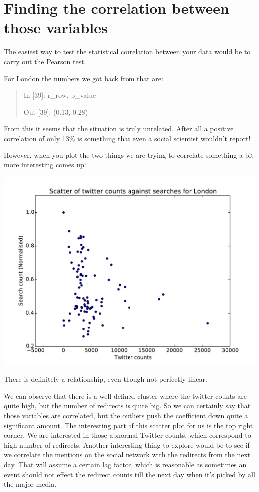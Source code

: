 \documentclass[minf,frontabs,twoside,singlespacing,parskip]{infthesis}
\begin{document}
\section{Finding the correlation between those variables}

The easiest way to test the statistical correlation between your data would be to carry out the Pearson test.

For London the numbers we got back from that are:
\begin{quotation}
In [39]: r\_row, p\_value

Out [39]: (0.13, 0.28)
\end{quotation}

From this it seems that the situation is truly unrelated. After all a positive correlation of only 13\% is something that even a social scientist wouldn't report!

However, when you plot the two things we are trying to correlate something a bit more interesting comes up:

\includegraphics[width=\textwidth]{scatterv1}

There is definitely a relationship, even though not perfectly linear.

We can observe that there is a well defined cluster where the twitter counts are quite high, but the number of redirects is quite big. So we can certainly say that those variables are correlated, but the outliers push the coefficient down quite a significant amount. The interesting part of this scatter plot for us is the top right corner. We are interested in those abnormal Twitter counts, which correspond to high number of redirects. Another interesting thing to explore would be to see if we correlate the mentions on the social network with the redirects from the next day. That will assume a certain lag factor, which is reasonable as sometimes an event should not effect the redirect counts till the next day when it's picked by all the major media.
\end{document}
